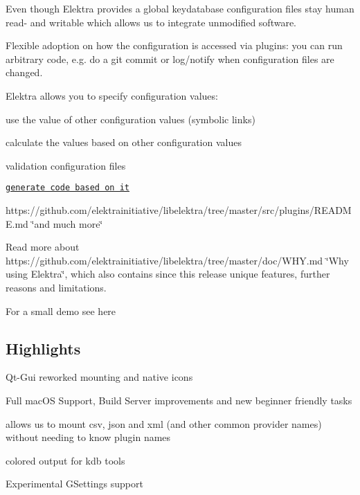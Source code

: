 \begin{DoxyEnumerate}
\item Even though Elektra provides a global keydatabase configuration files stay human read-\/ and writable which allows us to integrate unmodified software.
\item Flexible adoption on how the configuration is accessed via plugins\+: you can run arbitrary code, e.\+g. do a {\ttfamily git commit} or log/notify when configuration files are changed.
\item Elektra allows you to specify configuration values\+:
\begin{DoxyItemize}
\item use the value of other configuration values (symbolic links)
\item calculate the values based on other configuration values
\item validation configuration files
\item \href{https://github.com/elektrainitiative/libelektra/tree/master/src/tools/gen}{\tt generate code based on it}
\item https\+://github.com/elektrainitiative/libelektra/tree/master/src/plugins/\+R\+E\+A\+D\+M\+E.\+md \char`\"{}and much more\char`\"{}
\end{DoxyItemize}
\end{DoxyEnumerate}

Read more about https\+://github.com/elektrainitiative/libelektra/tree/master/doc/\+W\+H\+Y.\+md \char`\"{}\+Why using Elektra\char`\"{}, which also contains since this release unique features, further reasons and limitations.

For a small demo see here

\href{https://asciinema.org/a/cantr04assr4jkv8v34uz9b8r}{\tt }

\subsection*{Highlights}


\begin{DoxyItemize}
\item Qt-\/\+Gui reworked mounting and native icons
\item Full mac\+OS Support, Build Server improvements and new beginner friendly tasks
\item allows us to mount csv, json and xml (and other common provider names) without needing to know plugin names
\item colored output for kdb tools
\item Experimental G\+Settings support
\end{DoxyItemize}

